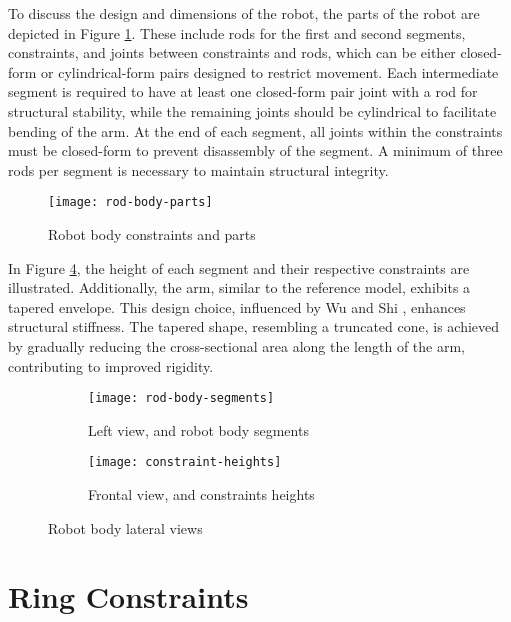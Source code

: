 To discuss the design and dimensions of the robot, the parts of the robot are depicted in Figure \ref{fig:bodyparts}. These include rods for the first and second segments, constraints, and joints between constraints and rods, which can be either closed-form or cylindrical-form pairs designed to restrict movement. Each intermediate segment is required to have at least one closed-form pair joint with a rod for structural stability, while the remaining joints should be cylindrical to facilitate bending of the arm. At the end of each segment, all joints within the constraints must be closed-form to prevent disassembly of the segment. A minimum of three rods per segment is necessary to maintain structural integrity.

\begin{figure}
    \centering
    \texttt{[image: rod-body-parts]}
    \caption{Robot body constraints and parts}
    \label{fig:bodyparts}
\end{figure}

In Figure \ref{fig:robot-body-lateral}, the height of each segment and their respective constraints are illustrated. Additionally, the arm, similar to the reference model, exhibits a tapered envelope. This design choice, influenced by Wu and Shi \cite{wu2022}, enhances structural stiffness. The tapered shape, resembling a truncated cone, is achieved by gradually reducing the cross-sectional area along the length of the arm, contributing to improved rigidity.

\begin{figure}[H]
    \centering
    \begin{subfigure}[t]{0.2625\textwidth}
        \texttt{[image: rod-body-segments]}
        \caption{Left view, and robot body segments}
        \label{fig:segments}
    \end{subfigure}
    \begin{subfigure}[t]{0.4375\textwidth}
        \texttt{[image: constraint-heights]}
        \caption{Frontal view, and constraints heights}
        \label{fig:cons-heights}
    \end{subfigure}
    \caption{Robot body lateral views}
    \label{fig:robot-body-lateral}
\end{figure}

\section{Ring Constraints}

